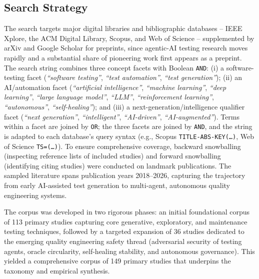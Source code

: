 \subsection{Search Strategy}
\label{subsec:search-strategy}
The search targets major digital libraries and bibliographic databases --
IEEE Xplore, the ACM Digital Library, Scopus, and Web of Science -- supplemented
by arXiv and Google Scholar for preprints, since agentic-AI testing research moves
rapidly and a substantial share of pioneering work first appears as a preprint.
The search string combines three concept facets with Boolean \texttt{AND}:
(i) a software-testing facet (\textit{``software testing''}, \textit{``test automation''},
\textit{``test generation''});
(ii) an AI/automation facet (\textit{``artificial intelligence''}, \textit{``machine learning''},
\textit{``deep learning''}, \textit{``large language model''}, \textit{``LLM''},
\textit{``reinforcement learning''}, \textit{``autonomous''}, \textit{``self-healing''}); and
(iii) a next-generation/intelligence qualifier facet (\textit{``next generation''},
\textit{``intelligent''}, \textit{``AI-driven''}, \textit{``AI-augmented''}).
Terms within a facet are joined by \texttt{OR}; the three facets are joined by
\texttt{AND}, and the string is adapted to each database's query syntax (e.g., Scopus
\texttt{TITLE-ABS-KEY(\ldots)}, Web of Science \texttt{TS=(\ldots)}).
To ensure comprehensive coverage, backward snowballing (inspecting reference lists of
included studies) and forward snowballing (identifying citing studies) were conducted
on landmark publications. The sampled literature spans publication years 2018--2026,
capturing the trajectory from early AI-assisted test generation to multi-agent,
autonomous quality engineering systems.

The corpus was developed in two rigorous phases: an initial foundational corpus of
113 primary studies capturing core generative, exploratory, and maintenance
testing techniques, followed by a targeted expansion of 36 studies dedicated to
the emerging quality engineering safety thread (adversarial security of testing agents,
oracle circularity, self-healing stability, and autonomous governance). This
yielded a comprehensive corpus of 149 primary studies that underpins the taxonomy
and empirical synthesis.

